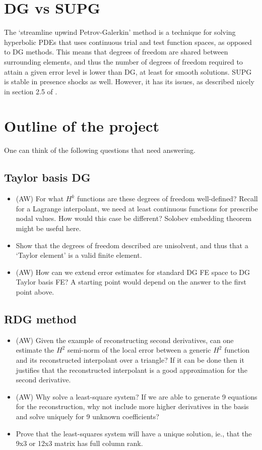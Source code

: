 \documentclass[11pt]{article}
\begin{document}
\section{DG vs SUPG}
The `streamline upwind Petrov-Galerkin' method is a technique for solving hyperbolic PDEs that uses continuous trial and test function spaces, as opposed to DG methods. This means that degrees of freedom are shared between surrounding elements, and thus the number of degrees of freedom required to attain a given error level is lower than DG, at least for smooth solutions. SUPG is stable in presence shocks as well. However, it has its issues, as described nicely in section 2.5 of \cite{hartmann_thesis}.

\section{Outline of the project}
One can think of the following questions that need answering.
\subsection{Taylor basis DG}
\begin{itemize}
\item (AW) For what $H^k$ functions are these degrees of freedom well-defined? Recall for a Lagrange interpolant, we need at least continuous functions for prescribe nodal values. How would this case be different? Solobev embedding theorem might be useful here.
\item Show that the degrees of freedom described are unisolvent, and thus that a `Taylor element' is a valid finite element.
\item (AW) How can we extend error estimates for standard DG FE space to DG Taylor basis FE? A starting point would depend on the answer to the first point above.
\end{itemize}
\subsection{RDG method}
\begin{itemize}
\item (AW) Given the example of reconstructing second derivatives, can one estimate the $H^2$ semi-norm of the local error between a generic $H^2$ function and its reconstructed interpolant over a triangle? If it can be done then it justifies that the reconstructed interpolant is a good approximation for the second derivative.
\item (AW) Why solve a least-square system? If we are able to generate 9 equations for the reconstruction, why not include more higher derivatives in the basis and solve uniquely for 9 unknown coefficients?
\item Prove that the least-squares system will have a unique solution, ie., that the 9x3 or 12x3 matrix has full column rank.
\end{itemize}
\end{document}
